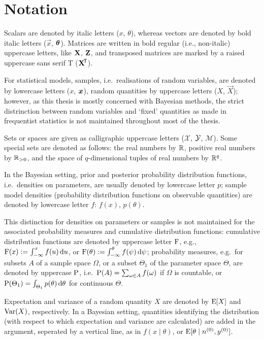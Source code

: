 \section{Notation}
\label{sec:notation}

Scalars are denoted by italic letters ($x$, $\theta$),
whereas vectors are denoted by bold italic letters ($\vec{x}$, $\boldsymbol{\theta}$).
Matrices are written in bold regular (i.e., non-italic) uppercase letters, like $\mathbf{X}$, $\mathbf{Z}$,
and transposed matrices are marked by a raised uppercase sans serif T ($\mathbf{X}^{{\mbox{\!\scriptsize\textsf{T}}}}$).

For statistical models, samples, i.e.\ realisations of random variables,
are denoted by lowercase letters ($x$, ${\bm x}$),
random quantities by uppercase letters ($X$, $\vec{X}$);
however, as this thesis is mostly concerned with Bayesian methods,
the strict distrinction between random variables and `fixed' quantities as made in frequentist statistics
is not maintained throughout most of the thesis.

Sets or spaces are given as calligraphic uppercase letters ($\mathcal{X}$, $\mathcal{Y}$, $\mathcal{M}$).
Some special sets are denoted as follows:
the real numbers by $\mathbb{R}$, positive real numbers by $\mathbb{R}_{>0}$,
and the space of $q$-dimensional tuples of real numbers by $\mathbb{R}^q$.

In the Bayesian setting, prior and posterior probability distribution functions, i.e.\ densities on parameters,
are usually denoted by lowercase letter $p$;
sample model densities (probability distribution functions on observable quantities)
are denoted by lowercase letter $f$:
$f(x)$, $p(\theta)$.

This distinction for densities on parameters or samples
is not maintained for the associated probability measures and cumulative distribution functions:
cumulative distribution functions are denoted by uppercase letter $\operatorname{F}$,
e.g., $\operatorname{F}(x) := \int_{-\infty}^x f(u) \,\mathrm{d} u$, or $\operatorname{F}(\theta) := \int_{-\infty}^\theta f(\psi) \,\mathrm{d} \psi$;
probability measures, e.g.\ for subsets $A$ of a sample space $\Omega$,
or a subset $\Theta_1$ of the parameter space $\Theta$,
are denoted by uppercase $\operatorname{P}$,
i.e.\ $\operatorname{P}(A) = \sum_{\omega \in A} f(\omega)$ if $\Omega$ is countable,
or $\operatorname{P}(\Theta_1) = \int_{\Theta_1} p(\theta) \,\mathrm{d} \theta$ for continuous $\Theta$.

Expectation and variance of a random quantity $X$ are denoted by $\operatorname{E}[X]$ and $\operatorname{Var}(X)$, respectively.
In a Bayesian setting, quantities identifying the distribution
(with respect to which expectation and variance are calculated)
are added in the argument, seperated by a vertical line, as in $f(x\mid\theta)$, or $\operatorname{E}[\theta\mid n^{(0)}, y^{(0)}]$.

